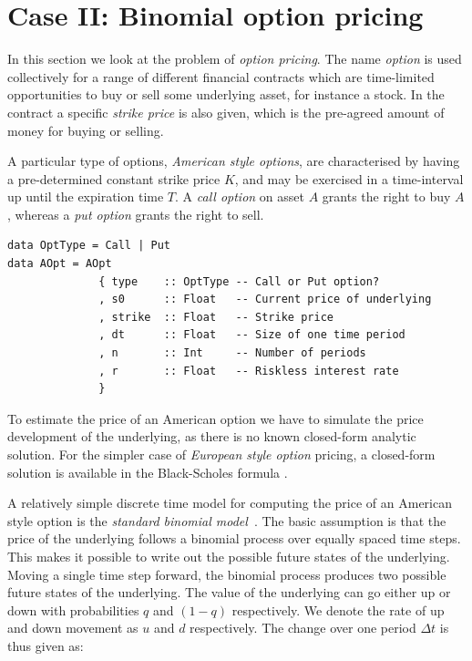 \documentclass[preprint]{sigplanconf}
\begin{document}
\section{Case II: Binomial option pricing}
In this section we look at the problem of \emph{option pricing}. The
name \emph{option} is used collectively for a range of different
financial contracts which are time-limited opportunities to buy or
sell some underlying asset, for instance a stock. In the contract a
specific \emph{strike price} is also given, which is the pre-agreed
amount of money for buying or selling.

A particular type of options, \emph{American style options}, are
characterised by having a pre-determined constant strike price $K$,
and may be exercised in a time-interval up until the expiration time
$T$. A \emph{call option} on asset $A$ grants the right to buy $A$,
whereas a \emph{put option} grants the right to sell.

\begin{verbatim}
data OptType = Call | Put
data AOpt = AOpt
              { type    :: OptType -- Call or Put option?
              , s0      :: Float   -- Current price of underlying
              , strike  :: Float   -- Strike price
              , dt      :: Float   -- Size of one time period
              , n       :: Int     -- Number of periods
              , r       :: Float   -- Riskless interest rate
              }
\end{verbatim}

To estimate the price of an American option we have to simulate the
price development of the underlying, as there is no known closed-form
analytic solution. For the simpler case of \emph{European style
  option} pricing, a closed-form solution is available in the
Black-Scholes formula \cite{black1973pricing}.

A relatively simple discrete time model for computing the price of an
American style option is the \emph{standard binomial
  model}~\cite{cox1979option}.  The basic assumption is that the price
of the underlying follows a binomial process over equally spaced time
steps. This makes it possible to write out the possible future states
of the underlying. Moving a single time step forward, the binomial
process produces two possible future states of the underlying. The
value of the underlying can go either up or down with probabilities
$q$ and $(1 - q)$ respectively. We denote the rate of up and down
movement as $u$ and $d$ respectively. The change over one period
$\Delta t$ is thus given as:
\end{document}
